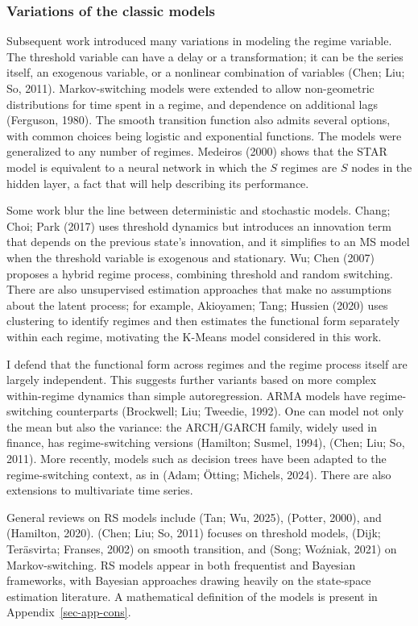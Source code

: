 \documentclass[
  letterpaper,
  DIV=11,
  numbers=noendperiod]{scrartcl}
\numberwithin{equation}{section}
\numberwithin{table}{section}
\numberwithin{figure}{section}
\begin{document}
\subsubsection{Variations of the classic
models}\label{variations-of-the-classic-models}

Subsequent work introduced many variations in modeling the regime
variable. The threshold variable can have a delay or a transformation;
it can be the series itself, an exogenous variable, or a nonlinear
combination of variables (Chen; Liu; So, 2011). Markov-switching models
were extended to allow non-geometric distributions for time spent in a
regime, and dependence on additional lags (Ferguson, 1980). The smooth
transition function also admits several options, with common choices
being logistic and exponential functions. The models were generalized to
any number of regimes. Medeiros (2000) shows that the STAR model is
equivalent to a neural network in which the \(S\) regimes are \(S\)
nodes in the hidden layer, a fact that will help describing its
performance.

Some work blur the line between deterministic and stochastic models.
Chang; Choi; Park (2017) uses threshold dynamics but introduces an
innovation term that depends on the previous state's innovation, and it
simplifies to an MS model when the threshold variable is exogenous and
stationary. Wu; Chen (2007) proposes a hybrid regime process, combining
threshold and random switching. There are also unsupervised estimation
approaches that make no assumptions about the latent process; for
example, Akioyamen; Tang; Hussien (2020) uses clustering to identify
regimes and then estimates the functional form separately within each
regime, motivating the K-Means model considered in this work.

I defend that the functional form across regimes and the regime process
itself are largely independent. This suggests further variants based on
more complex within-regime dynamics than simple autoregression. ARMA
models have regime-switching counterparts (Brockwell; Liu; Tweedie,
1992). One can model not only the mean but also the variance: the
ARCH/GARCH family, widely used in finance, has regime-switching versions
(Hamilton; Susmel, 1994), (Chen; Liu; So, 2011). More recently, models
such as decision trees have been adapted to the regime-switching
context, as in (Adam; Ötting; Michels, 2024). There are also extensions
to multivariate time series.

General reviews on RS models include (Tan; Wu, 2025), (Potter, 2000),
and (Hamilton, 2020). (Chen; Liu; So, 2011) focuses on threshold models,
(Dijk; Teräsvirta; Franses, 2002) on smooth transition, and (Song;
Woźniak, 2021) on Markov-switching. RS models appear in both frequentist
and Bayesian frameworks, with Bayesian approaches drawing heavily on the
state-space estimation literature. A mathematical definition of the
models is present in Appendix~\ref{sec-app-cons}.
\end{document}
